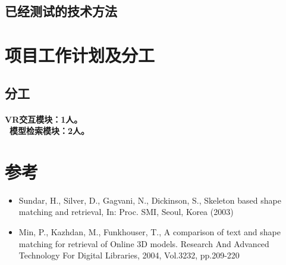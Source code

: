 \documentclass{article}
\begin{document}
\subsection{已经测试的技术方法}

\section{项目工作计划及分工}
\subsection{分工}
\paragraph{VR交互模块：1人。 \\\ 模型检索模块：2人。
}

\section{参考}
\begin{itemize}
    \item Sundar, H., Silver, D., Gagvani, N., Dickinson, S., Skeleton based shape matching and retrieval, In: Proc. SMI, Seoul, Korea (2003)
    \item Min, P., Kazhdan, M., Funkhouser, T., A comparison of text and shape matching for retrieval of Online 3D models. Research And Advanced Technology For Digital Libraries, 2004, Vol.3232, pp.209-220
\end{itemize}
\end{document}
